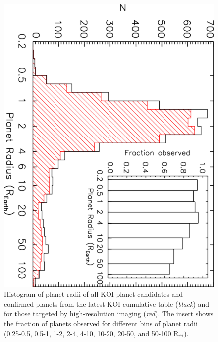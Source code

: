 \documentclass[twocolumn,appendixfloats]{aastex6}
\newcommand{\RE}{R$_{\Earth}$}
\begin{document}
\begin{figure}[!t]
\centering
\includegraphics[angle=90, scale=0.4]{KOI_planets_Prad_histo.pdf}
\caption{Histogram of planet radii of all KOI planet candidates and 
confirmed planets from the latest KOI cumulative table ({\it black})
and for those targeted by high-resolution imaging ({\it red}). The 
insert shows the fraction of planets observed for different bins of
planet radii (0.25-0.5, 0.5-1, 1-2, 2-4, 4-10, 10-20, 20-50, and 
50-100 \RE).
\label{KOIs_Rp_histo}}
\end{figure}
\end{document}

